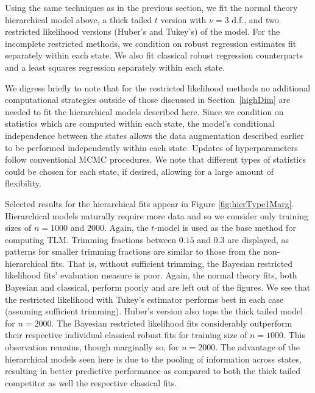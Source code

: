 \documentclass[12pt]{article}
\begin{document}
Using the same techniques as in the previous section, 
we fit the normal theory hierarchical model above, a thick tailed $t$ version with $\nu = 3$ d.f., and two restricted likelihood versions (Huber's and Tukey's) of the model.  For the incomplete restricted methods, we condition on robust regression estimates fit separately within each state. We also fit classical robust regression counterparts and a least squares regression separately within each state.  

We digress briefly to note that for the restricted likelihood methods no additional computational strategies outside of those discussed in Section~\ref{highDim} are needed to fit the hierarchical models described here. Since we condition on statistics which are computed within each state, the model's conditional independence between the states allows the data augmentation described earlier to be performed independently within each state.  Updates of hyperparameters follow conventional MCMC procedures.  We note that different types of statistics could be chosen for each state, if desired, allowing for a large amount of flexibility.  

Selected results for the hierarchical fits appear in Figure
\ref{fig:hierType1Marg}. Hierarchical models naturally require more
data and so we consider only training sizes of $n=1000$ and
$2000$.  Again, the $t$-model is used as the base
method for computing TLM. Trimming fractions between $0.15$ and $0.3$ are displayed, as patterns for smaller trimming fractions are similar to those from the non-hierarchical fits. That is, without sufficient trimming, the Bayesian restricted likelihood fits' evaluation measure is poor. Again, the normal theory fits, both Bayesian and classical, perform poorly and are left out of the figures.  We see that the restricted likelihood with Tukey's estimator performs best in each case (assuming sufficient trimming). Huber's version also tops the thick tailed model for $n=2000$.  The Bayesian restricted likelihood fits considerably outperform their respective individual classical robust fits for training size of $n=1000$. This observation remains, though marginally so, for $n=2000$. The advantage of the hierarchical models seen here is due to the pooling of information across states, resulting in better predictive performance as compared to both the thick tailed competitor as well the respective classical fits.
\end{document}
